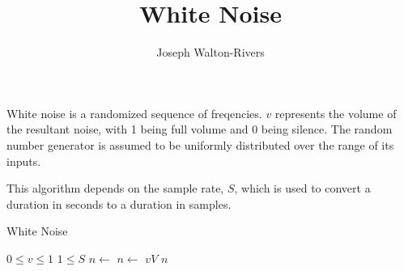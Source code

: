 \documentclass{../fal_assignment}
\title{White Noise}
\author{Joseph Walton-Rivers}
\begin{document}
\maketitle

White noise is a randomized sequence of freqencies. $v$ represents the volume of the resultant noise, with 1 being full volume and 0 being silence. The random number generator is assumed to be uniformly distributed over the range of its inputs.

This algorithm depends on the sample rate, $S$, which is used to convert a duration in seconds to a duration in samples.

\begin{algorithm}[ht]
	\caption{White Noise}
	\label{alg:algorithm}
	
	\begin{algorithmic}[1]
		\Require
		\Statex $0 \le v \le 1$
		\Statex $1 \le S$ 
		\Ensure
		\State $n\gets$ 
		\State $n\gets$  $v V$
		\EndFor
		\State \Return $n$
		\EndFunction
	\end{algorithmic}
\end{algorithm}
\end{document}
